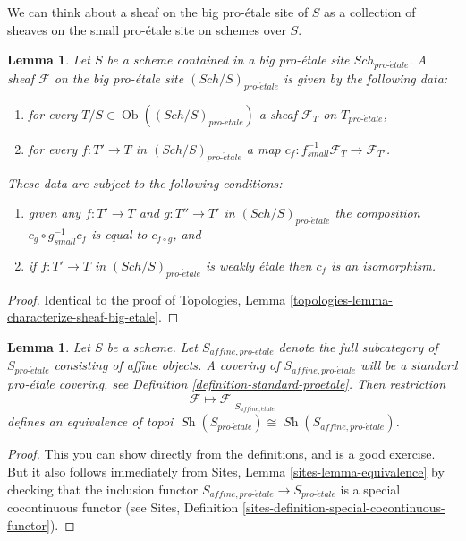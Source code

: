 \documentclass{stacks-project}
\theoremstyle{plain}
\newtheorem{lemma}[subsection]{Lemma}
\theoremstyle{definition}
\theoremstyle{remark}
\numberwithin{equation}{subsection}
\def\Sch{\mathit{Sch}}
\def\Ob{\mathop{\mathrm{Ob}}\nolimits}
\def\Sh{\mathop{\mathit{Sh}}\nolimits}
\def\proetale{{pro\text{-}\acute{e}tale}}
\def\etale{{\acute{e}tale}}
\begin{document}
\noindent
We can think about a sheaf on the big pro-\'etale site of $S$ as a collection
of sheaves on the small pro-\'etale site on schemes over $S$.

\begin{lemma}
\label{lemma-characterize-sheaf-big}
Let $S$ be a scheme contained in a big pro-\'etale site $\Sch_\proetale$.
A sheaf $\mathcal{F}$ on the big pro-\'etale site $(\Sch/S)_\proetale$
is given by the following data:
\begin{enumerate}
\item for every $T/S \in \Ob((\Sch/S)_\proetale)$ a sheaf
$\mathcal{F}_T$ on $T_\proetale$,
\item for every $f : T' \to T$ in
$(\Sch/S)_\proetale$ a map
$c_f : f_{small}^{-1}\mathcal{F}_T \to \mathcal{F}_{T'}$.
\end{enumerate}
These data are subject to the following conditions:
\begin{enumerate}
\item[(a)] given any $f : T' \to T$ and $g : T'' \to T'$ in
$(\Sch/S)_\proetale$ the composition
$c_g \circ g_{small}^{-1}c_f$ is equal to $c_{f \circ g}$, and
\item[(b)] if $f : T' \to T$ in $(\Sch/S)_\proetale$
is weakly \'etale then $c_f$ is an isomorphism.
\end{enumerate}
\end{lemma}

\begin{proof}
Identical to the proof of
Topologies, Lemma \ref{topologies-lemma-characterize-sheaf-big-etale}.
\end{proof}

\begin{lemma}
\label{lemma-alternative}
Let $S$ be a scheme. Let $S_{affine, \proetale}$ denote the full subcategory
of $S_\proetale$ consisting of affine objects. A covering of
$S_{affine, \proetale}$ will be a standard pro-\'etale covering, see
Definition \ref{definition-standard-proetale}.
Then restriction
$$
\mathcal{F} \longmapsto \mathcal{F}|_{S_{affine, \etale}}
$$
defines an equivalence of topoi
$\Sh(S_\proetale) \cong \Sh(S_{affine, \proetale})$.
\end{lemma}

\begin{proof}
This you can show directly from the definitions, and is a good exercise.
But it also follows immediately from
Sites, Lemma \ref{sites-lemma-equivalence}
by checking that the inclusion functor
$S_{affine, \proetale} \to S_\proetale$
is a special cocontinuous functor (see
Sites, Definition \ref{sites-definition-special-cocontinuous-functor}).
\end{proof}
\end{document}
